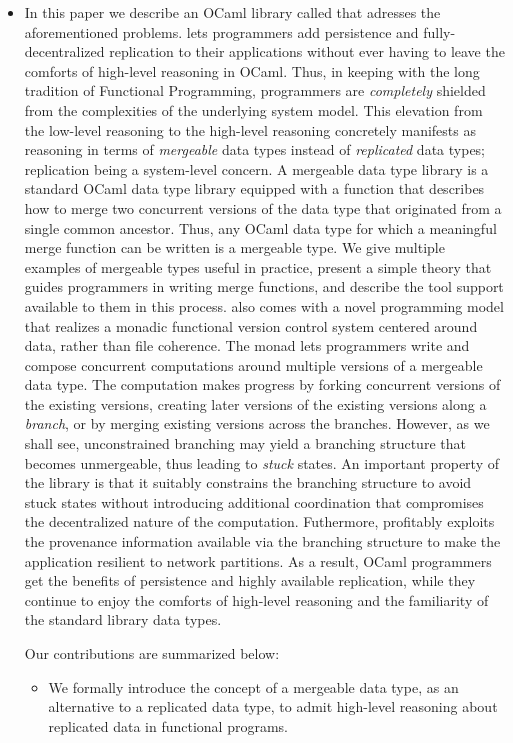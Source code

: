 \begin{itemize}
  \item In this paper we describe an OCaml library called \name that
  adresses the aforementioned problems. \name lets programmers add
  persistence and fully-decentralized replication to their
  applications without ever having to leave the comforts of high-level
  reasoning in OCaml. Thus, in keeping with the long tradition of
  Functional Programming, programmers are \emph{completely} shielded
  from the complexities of the underlying system model. This elevation
  from the low-level reasoning to the high-level reasoning concretely
  manifests as reasoning in terms of \emph{mergeable} data types
  instead of \emph{replicated} data types; replication being a
  system-level concern. A mergeable data type library is a standard
  OCaml data type library equipped with a  function that
  describes how to merge two concurrent versions of the data type that
  originated from a single common ancestor. Thus, any OCaml data type
  for which a meaningful merge function can be written is a mergeable
  type. We give multiple examples of mergeable types useful in
  practice, present a simple theory that guides programmers in writing
  merge functions, and describe the tool support available to them in
  this process. \name also comes with a novel programming model that
  realizes a monadic functional version control system centered around
  data, rather than file coherence. The \name monad lets programmers
  write and compose concurrent computations around multiple versions
  of a mergeable data type. The computation makes progress by forking
  concurrent versions of the existing versions, creating later
  versions of the existing versions along a \emph{branch}, or by
  merging existing versions across the branches. However, as we shall
  see, unconstrained branching may yield a branching structure that
  becomes unmergeable, thus leading to \emph{stuck} states. An
  important property of the \name library is that it suitably
  constrains the branching structure to avoid stuck states without
  introducing additional coordination that compromises the
  decentralized nature of the computation. Futhermore, \name
  profitably exploits the provenance information available via the
  branching structure to make the application resilient to network
  partitions. As a result, OCaml programmers get the benefits of
  persistence and highly available replication, while they continue to
  enjoy the comforts of high-level reasoning and the familiarity of
  the standard library data types.

  Our contributions are summarized below:
  \begin{itemize}
    \item We formally introduce the concept of a mergeable data type,
    as an alternative to a replicated data type, to admit high-level
    reasoning about replicated data in functional programs.


\end{itemize}
\end{itemize}
